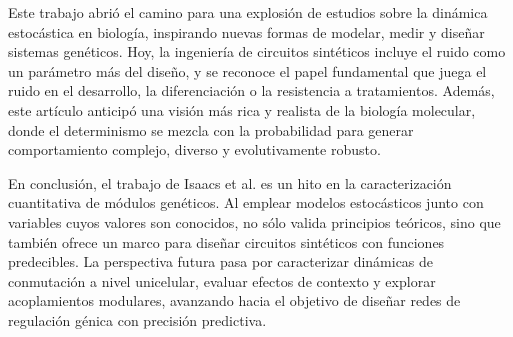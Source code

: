 \documentclass[nochap]{config/ejercicios}
\begin{document}
Este trabajo abrió el camino para una explosión de estudios sobre la dinámica estocástica en biología, inspirando nuevas formas de modelar, medir y diseñar sistemas genéticos. Hoy, la ingeniería de circuitos sintéticos incluye el ruido como un parámetro más del diseño, y se reconoce el papel fundamental que juega el ruido en el desarrollo, la diferenciación o la resistencia a tratamientos. Además, este artículo anticipó una visión más rica y realista de la biología molecular, donde el determinismo se mezcla con la probabilidad para generar comportamiento complejo, diverso y evolutivamente robusto.


En conclusión, el trabajo de Isaacs et al. es un hito en la caracterización cuantitativa de módulos genéticos. Al emplear modelos estocásticos junto con variables cuyos valores son conocidos, no sólo valida principios teóricos, sino que también ofrece un marco para diseñar circuitos sintéticos con funciones predecibles. La perspectiva futura pasa por caracterizar dinámicas de conmutación a nivel unicelular, evaluar efectos de contexto y explorar acoplamientos modulares, avanzando hacia el objetivo de diseñar redes de regulación génica con precisión predictiva.

\printbibliography
\end{document}
